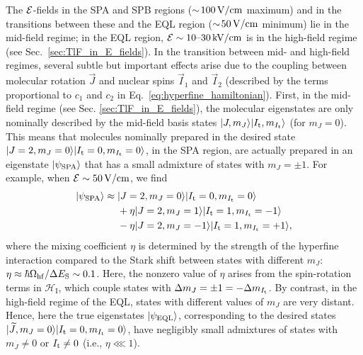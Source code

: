 The $\Esca$-fields in the SPA and SPB regions ($\sim\!100 \Vcm$ maximum) and in the transitions between these and the EQL region ($\sim\!50 \Vcm$ minimum) lie in the mid-field regime; in the EQL region, $\Esca \sim \hbox{10--30} \kVcm$ is in the high-field regime (see Sec.~\ref{sec:TlF_in_E_fields}). In the transition between mid- and high-field regimes, several subtle but important effects arise due to the coupling between molecular rotation $\vec{J}$ and nuclear spins $\vec{I}_1$ and $\vec{I}_2$ (described by the terms proportional to $c_1 $ and $c_2$ in Eq.~\ref{eq:hyperfine_hamiltonian}). 
First, in the mid-field regime (see Sec. \ref{sec:TlF_in_E_fields}), the molecular eigenstates are only nominally described by the mid-field basis states $\ket{J,m_J}\ket{\It,m_{\It}}$ (for $m_J=0$). This means that molecules nominally prepared in the desired state $ \ket{J=2, m_J = 0}\ket{\It=0,m_{\It}=0} $, in the SPA region, are actually prepared in an eigenstate $\ket{\psi_{\rm SPA}}$ that has a small admixture of states with $ m_J = \pm 1 $.
For example, when $\Esca \sim 50 \Vcm$, %
we find
\begin{equation}
    \begin{split}
    	\ket{\psi_{\rm SPA}} \approx{} & \ket{J=2,m_J=0}\ket{\It=0,m_{\It}=0} \label{eq:SPA_ket}\\
        & {}+\eta \ket{J = 2, m_J = 1}\ket{\It=1,m_{\It}=-1} \\
    	 & {}-\eta \ket{J = 2, m_J = -1}\ket{\It=1,m_{\It}=+1},
    \end{split}
\end{equation}
where the mixing coefficient $\eta$ is determined by the strength of the hyperfine interaction compared to the Stark shift between states with different $m_J$: $\eta \approx \hbar\Omega_{\rm hf}/\Delta E_{\rm S} \sim 0.1$.  Here, the nonzero value of $\eta$ arises from the spin-rotation terms in $\mathcal{H}_\text{I}$, which couple states with $\Delta m_J = \pm 1 = -\Delta m_{\It}$. By contrast, in the high-field regime of the EQL, states with different values of $m_J$ are very distant. Hence, here the true eigenstates $\ket{\psi_{\rm EQL}}$, corresponding to the desired states $\ket{\widetilde{J},m_J=0}\ket{\It=0,m_{\It}=0}$, have negligibly small admixtures of states with $m_J\neq 0$ or $\It\neq 0$ (i.e., $\eta \lll 1$).

